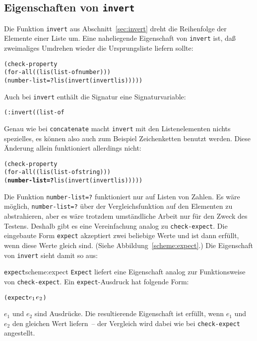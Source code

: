 \subsection{Eigenschaften von \texttt{invert}}

Die Funktion \texttt{invert} aus Abschnitt~\ref{sec:invert} dreht die
Reihenfolge der Elemente einer Liste um.  Eine naheliegende
Eigenschaft von \texttt{invert} ist, daß zweimaliges Umdrehen wieder
die Ursprungsliste liefern sollte:
%
\begin{alltt}
(check-property
 (for-all ((lis (list-of number)))
   (number-list=? lis (invert (invert lis)))))
\end{alltt}
%
Auch bei \texttt{invert} enthält die Signatur eine Signaturvariable:
%
\begin{alltt}
(: invert ((list-of %a) -> (list-of %a)))
\end{alltt}
%
Genau wie bei \texttt{concatenate} macht \texttt{invert} mit den
Listenelementen nichts spezielles, es können also auch zum Beispiel Zeichenketten
benutzt werden.  Diese Änderung allein funktioniert allerdings nicht:
%
\begin{alltt}
(check-property
 (for-all ((lis (list-of string)))
   (\textbf{number-list=?} lis (invert (invert lis)))))
\end{alltt}
%
Die Funktion \texttt{number-list=?} funktioniert nur auf Listen von
Zahlen.  Es wäre möglich, \texttt{number-list=?} über der
Vergleichsfunktion auf den Elementen zu abstrahieren, aber es wäre
trotzdem umständliche Arbeit nur für den Zweck des Testens.  Deshalb 
gibt es eine Vereinfachung analog zu \texttt{check-expect}.  Die eingebaute Form \texttt{expect}
akzeptiert zwei beliebige Werte und ist dann erfüllt, wenn diese Werte
gleich sind.  (Siehe Abbildung~\ref{scheme:expect}.)  Die Eigenschaft
von \texttt{invert} sieht damit so aus:

\begin{feature}{\texttt{expect}}{scheme:expect}
  \texttt{Expect} liefert eine
  Eigenschaft analog zur Funktionsweise von
  \texttt{check-expect}.  Ein \texttt{expect}-Ausdruck hat folgende
  Form:
\begin{alltt}
(expect \(e\sb{1}\)  \(e\sb{2}\))
\end{alltt}
%
$e_1$ und $e_2$ sind Ausdrücke.  Die resultierende Eigenschaft ist
erfüllt, wenn $e_1$ und $e_2$ den gleichen Wert liefern~-- der
Vergleich wird dabei wie bei \texttt{check-expect} angestellt.

\end{feature}

